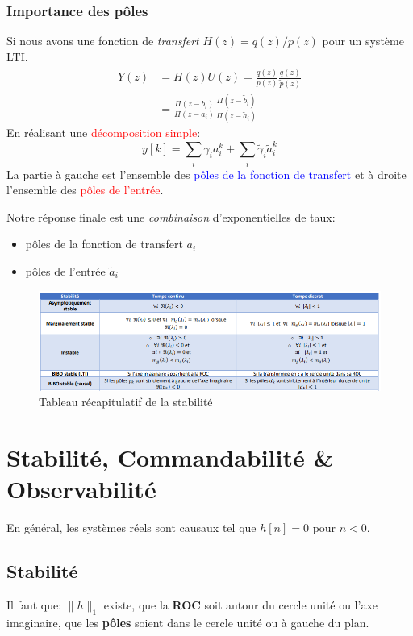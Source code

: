 \documentclass{report}
\begin{document}
\subsection{Importance des pôles}
Si nous avons une fonction de \textit{transfert} $H(z) = q(z)/p(z)$ pour un système LTI.
\begin{align*}
Y(z) &= H(z) U(z) = \frac{q(z)}{p(z)} \frac{\tilde{q}(z)}{\tilde{p}(z)}\\
&= \frac{\Pi (z-b_i)}{\Pi (z-a_i)} \frac{\Pi (z- \tilde{b}_i)}{\Pi (z - \tilde{a}_i)}
\end{align*}
En réalisant une \textcolor{red}{décomposition simple}:
\begin{equation}
y[k] = \sum_i \gamma_i a_i^k + \sum_i \tilde{\gamma}_i \tilde{a}_i^k
\end{equation}
La partie à gauche est l'ensemble des \textcolor{blue}{pôles de la fonction de transfert} et à droite l'ensemble des \textcolor{red}{pôles de l'entrée}.\par
Notre réponse finale est une \textit{combinaison} d'exponentielles de taux:
\begin{itemize}
\item pôles de la fonction de transfert $a_i$
\item pôles de l'entrée $\tilde{a}_i$
\end{itemize}
\begin{figure}[H]
\centering
\includegraphics[width=15cm]{img/stabilite.png}
\caption{Tableau récapitulatif de la stabilité}
\end{figure}



\chapter{Stabilité, Commandabilité \& Observabilité}

En général, les systèmes réels sont causaux tel que $h[n] = 0$ pour $n<0$.
\section{Stabilité}
Il faut que: $\parallel h \parallel_1$ existe, que la \textbf{ROC} soit autour du cercle unité ou l'axe imaginaire, que les \textbf{pôles} soient dans le cercle unité ou à gauche du plan.
\end{document}
